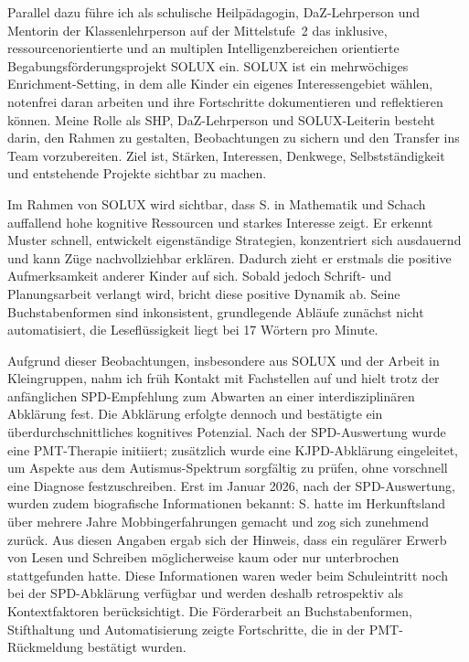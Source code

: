 \documentclass[ngerman, a4paper]{article}
\begin{document}
Parallel dazu führe ich als schulische Heilpädagogin, DaZ-Lehrperson und Mentorin
der Klassenlehrperson auf der Mittelstufe~2 das inklusive, ressourcenorientierte
und an multiplen Intelligenzbereichen orientierte Begabungsförderungsprojekt SOLUX
ein. SOLUX ist ein mehrwöchiges Enrichment-Setting, in dem alle Kinder ein eigenes
Interessengebiet wählen, notenfrei daran arbeiten und ihre Fortschritte dokumentieren
und reflektieren können. Meine Rolle als SHP, DaZ-Lehrperson und
SOLUX-Leiterin besteht darin, den Rahmen zu gestalten, Beobachtungen zu sichern
und den Transfer ins Team vorzubereiten. Ziel ist, Stärken, Interessen, Denkwege,
Selbstständigkeit und entstehende Projekte sichtbar zu machen.

Im Rahmen von SOLUX wird sichtbar, dass S. in Mathematik und Schach auffallend
hohe kognitive Ressourcen und starkes Interesse zeigt. Er erkennt Muster schnell,
entwickelt eigenständige Strategien, konzentriert sich ausdauernd und kann Züge
nachvollziehbar erklären. Dadurch zieht er erstmals die positive Aufmerksamkeit
anderer Kinder auf sich. Sobald jedoch Schrift- und Planungsarbeit verlangt wird,
bricht diese positive Dynamik ab. Seine Buchstabenformen sind inkonsistent,
grundlegende Abläufe zunächst nicht automatisiert, die Leseflüssigkeit liegt bei
17 Wörtern pro Minute.

Aufgrund dieser Beobachtungen, insbesondere aus SOLUX und der Arbeit in
Kleingruppen, nahm ich früh Kontakt mit Fachstellen auf und hielt trotz der
anfänglichen SPD-Empfehlung zum Abwarten an einer interdisziplinären Abklärung
fest. Die Abklärung erfolgte dennoch und bestätigte ein überdurchschnittliches kognitives Potenzial. 
Nach der
SPD-Auswertung wurde eine PMT-Therapie initiiert; zusätzlich wurde eine
KJPD-Abklärung eingeleitet, um Aspekte aus dem Autismus-Spektrum sorgfältig
zu prüfen, ohne vorschnell eine Diagnose festzuschreiben. Erst im Januar 2026,
nach der SPD-Auswertung, wurden zudem biografische Informationen bekannt:
S. hatte im Herkunftsland über mehrere Jahre Mobbingerfahrungen gemacht und zog sich
zunehmend zurück. Aus diesen Angaben ergab sich der Hinweis, dass
ein regulärer Erwerb von Lesen und Schreiben möglicherweise kaum oder nur
unterbrochen stattgefunden hatte. Diese Informationen waren weder beim
Schuleintritt noch bei der SPD-Abklärung verfügbar und werden deshalb
retrospektiv als Kontextfaktoren berücksichtigt. Die Förderarbeit an
Buchstabenformen, Stifthaltung und Automatisierung zeigte Fortschritte, die in
der PMT-Rückmeldung bestätigt wurden.
 
\end{document}
